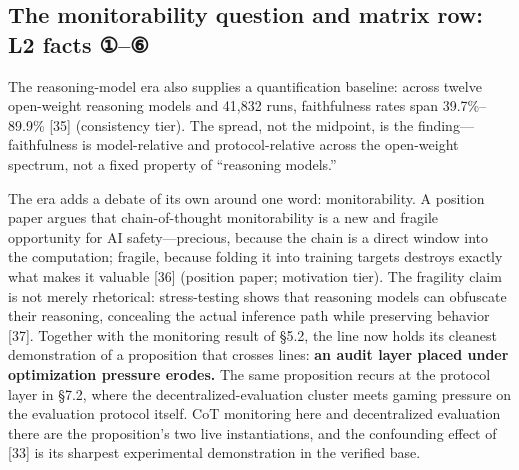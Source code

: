 \documentclass[11pt]{article}
\begin{document}
\subsection{The monitorability question and matrix row: L2 facts ①–⑥}
\noindent The reasoning-model era also supplies a quantification baseline: across twelve open-weight reasoning models and 41,832 runs, faithfulness rates span 39.7\%–89.9\% [35] (consistency tier). The spread, not the midpoint, is the finding—faithfulness is model-relative and protocol-relative across the open-weight spectrum, not a fixed property of ``reasoning models.''\par
\noindent The era adds a debate of its own around one word: monitorability. A position paper argues that chain-of-thought monitorability is a new and fragile opportunity for AI safety—precious, because the chain is a direct window into the computation; fragile, because folding it into training targets destroys exactly what makes it valuable [36] (position paper; motivation tier). The fragility claim is not merely rhetorical: stress-testing shows that reasoning models can obfuscate their reasoning, concealing the actual inference path while preserving behavior [37]. Together with the monitoring result of §5.2, the line now holds its cleanest demonstration of a proposition that crosses lines: \textbf{an audit layer placed under optimization pressure erodes.} The same proposition recurs at the protocol layer in §7.2, where the decentralized-evaluation cluster meets gaming pressure on the evaluation protocol itself. CoT monitoring here and decentralized evaluation there are the proposition's two live instantiations, and the confounding effect of [33] is its sharpest experimental demonstration in the verified base.\par
\begingroup\footnotesize
\end{document}
